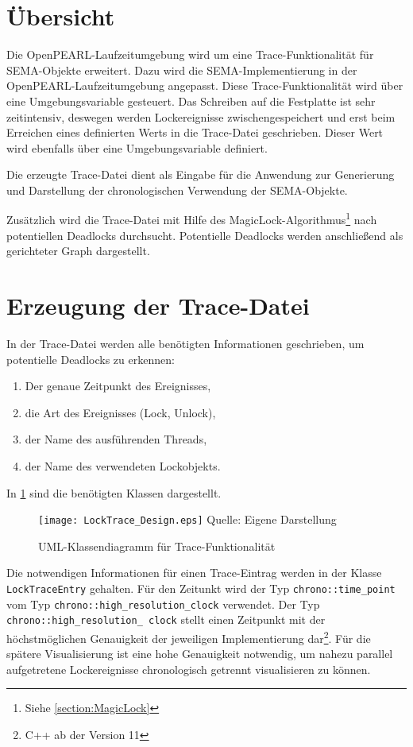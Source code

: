 \section{Übersicht}
\label{section:Übersicht}
Die OpenPEARL-Laufzeitumgebung wird um eine Trace-Funktionalität für
\textrm{SEMA}-Objekte erweitert. Dazu wird die \textrm{SEMA}-Implementierung in
der OpenPEARL-Laufzeitumgebung angepasst. Diese Trace-Funktionalität wird über
eine Umgebungsvariable gesteuert. Das Schreiben auf die Festplatte ist sehr
zeitintensiv, deswegen werden Lockereignisse zwischengespeichert und erst beim
Erreichen eines definierten Werts in die Trace-Datei geschrieben. Dieser Wert
wird ebenfalls über eine Umgebungsvariable definiert.

Die erzeugte Trace-Datei dient als Eingabe für die Anwendung zur Generierung und
Darstellung der chronologischen Verwendung der \textrm{SEMA}-Objekte.

Zusätzlich wird die Trace-Datei mit Hilfe des
MagicLock-Algorithmus\footnote{Siehe \cref{section:MagicLock}} nach potentiellen
Deadlocks durchsucht. Potentielle Deadlocks werden anschließend als gerichteter
Graph dargestellt.

\section{Erzeugung der Trace-Datei}
\label{section:Erzeugung der Trace-Datei}
In der Trace-Datei werden alle benötigten Informationen geschrieben, um
potentielle Deadlocks zu erkennen:
\begin{enumerate}
  \item Der genaue Zeitpunkt des Ereignisses,
  \item die Art des Ereignisses (Lock, Unlock),
  \item der Name des ausführenden Threads,
  \item der Name des verwendeten Lockobjekts.
\end{enumerate}

In \cref{fig:LockTrace_Design} sind die benötigten Klassen dargestellt.
\begin{figure}[ht]
  \texttt{[image: LockTrace\_Design.eps]}
  \footnotesize\sffamily Quelle: Eigene Darstellung
  \caption{UML-Klassendiagramm für Trace-Funktionalität}
  \label{fig:LockTrace_Design}
\end{figure}
Die notwendigen Informationen für einen Trace-Eintrag werden in der Klasse
\texttt{Lock\-Trace\-Entry} gehalten. Für den Zeitunkt wird der Typ 
\texttt{chrono::\-time\_point} vom Typ \texttt{chrono::\-high\_\allowbreak resolution\_\allowbreak clock}
verwendet. Der Typ \texttt{chrono::\-high\_\allowbreak resolution\_\allowbreak
clock} stellt einen Zeitpunkt mit der höchstmöglichen Genauigkeit der jeweiligen
Implementierung dar\footnote{C++ ab der Version 11}. Für die spätere
Visualisierung ist eine hohe Genauigkeit notwendig, um nahezu parallel
aufgetretene Lockereignisse chronologisch getrennt visualisieren zu können.

